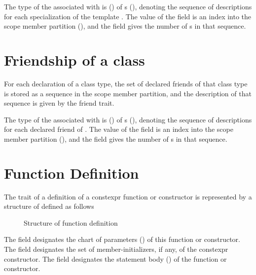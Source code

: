 The type  of the  associated with  is  ()
of s (),
denoting the sequence of descriptions for each specialization of the template .  The
value of the field  is an index into the scope member partition 
(), and the field  gives the number of s
in that sequence.



\section{Friendship of a class}
\label{sec:ifc-friend-trait}

For each declaration  of a class type, the set of declared friends of that class type 
is stored as a sequence in the scope member partition, and the description of that sequence is given by the friend trait.


The type  of the  associated with  is  ()
of s (),
denoting the sequence of descriptions for each declared friend of .  The
value of the field  is an index into the scope member partition 
(), and the field  gives the number of s
in that sequence.



\section{Function Definition}
\label{sec:ifc-function-definition-trait}

The trait of a definition of a constexpr function or constructor is represented by a structure of defined as follows
\begin{figure}[H]
	\centering
	\caption{Structure of function definition}
	\label{fig:ifc-function-definition-structure}
\end{figure}
%
The  field designates the chart of parameters () of this function or constructor.
The  field designates the set of member-initializers, if any, of the constexpr constructor.
The  field designates the statement body () of the function or constructor.

